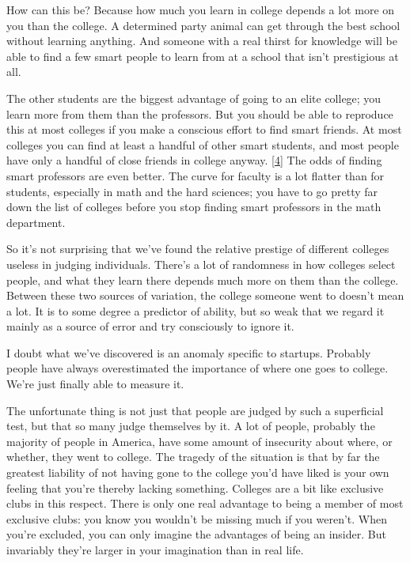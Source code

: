 How can this be? Because how much you learn in college depends a lot
more on you than the college. A determined party animal can get through
the best school without learning anything. And someone with a real
thirst for knowledge will be able to find a few smart people to learn
from at a school that isn't prestigious at all.

The other students are the biggest advantage of going to an elite
college; you learn more from them than the professors. But you should be
able to reproduce this at most colleges if you make a conscious effort
to find smart friends. At most colleges you can find at least a handful
of other smart students, and most people have only a handful of close
friends in college anyway. {[}\hyperref[f4n]{4}{]} The odds of finding
smart professors are even better. The curve for faculty is a lot flatter
than for students, especially in math and the hard sciences; you have to
go pretty far down the list of colleges before you stop finding smart
professors in the math department.

So it's not surprising that we've found the relative prestige of
different colleges useless in judging individuals. There's a lot of
randomness in how colleges select people, and what they learn there
depends much more on them than the college. Between these two sources of
variation, the college someone went to doesn't mean a lot. It is to some
degree a predictor of ability, but so weak that we regard it mainly as a
source of error and try consciously to ignore it.

I doubt what we've discovered is an anomaly specific to startups.
Probably people have always overestimated the importance of where one
goes to college. We're just finally able to measure it.

The unfortunate thing is not just that people are judged by such a
superficial test, but that so many judge themselves by it. A lot of
people, probably the majority of people in America, have some amount of
insecurity about where, or whether, they went to college. The tragedy of
the situation is that by far the greatest liability of not having gone
to the college you'd have liked is your own feeling that you're thereby
lacking something. Colleges are a bit like exclusive clubs in this
respect. There is only one real advantage to being a member of most
exclusive clubs: you know you wouldn't be missing much if you weren't.
When you're excluded, you can only imagine the advantages of being an
insider. But invariably they're larger in your imagination than in real
life.

